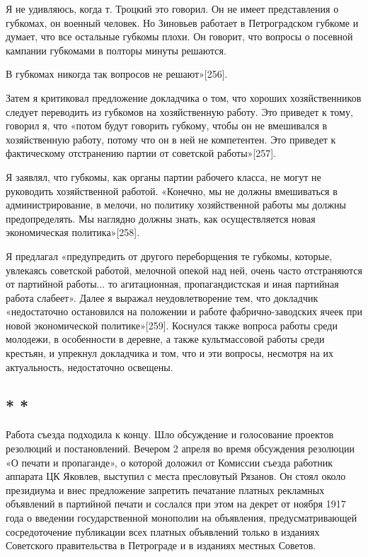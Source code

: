 \documentclass[12pt, a4paper, openany]{book}
\begin{document}
Я не удивляюсь, когда т. Троцкий это говорил. Он не имеет представления о губкомах, он военный человек. Но Зиновьев работает в Петроградском губкоме и думает, что все остальные губкомы плохи. Он говорит, что вопросы о посевной кампании губкомами в полторы минуты решаются.

В губкомах никогда так вопросов не решают»[256].

Затем я критиковал предложение докладчика о том, что хороших хозяйственников следует переводить из губкомов на хозяйственную работу. Это приведет к тому, говорил я, что «потом будут говорить губкому, чтобы он не вмешивался в хозяйственную работу, потому что он в ней не компетентен. Это приведет к фактическому отстранению партии от советской работы»[257].

Я заявлял, что губкомы, как органы партии рабочего класса, не могут не руководить хозяйственной работой. «Конечно, мы не должны вмешиваться в администрирование, в мелочи, но политику хозяйственной работы мы должны предопределять. Мы наглядно должны знать, как осуществляется новая экономическая политика»[258].

Я предлагал «предупредить от другого переборщения те губкомы, которые, увлекаясь советской работой, мелочной опекой над ней, очень часто отстраняются от партийной работы... то агитационная, пропагандистская и иная партийная работа слабеет». Далее я выражал неудовлетворение тем, что докладчик «недостаточно остановился на положении и работе фабрично-заводских ячеек при новой экономической политике»[259]. Коснулся также вопроса работы среди молодежи, в особенности в деревне, а также культмассовой работы среди крестьян, и упрекнул докладчика и том, что и эти вопросы, несмотря на их актуальность, недостаточно освещены.

\subsection*{\center * * *}

Работа съезда подходила к концу. Шло обсуждение и голосование проектов резолюций и постановлений. Вечером 2 апреля во время обсуждения резолюции «О печати и пропаганде», о которой доложил от Комиссии съезда работник аппарата ЦК Яковлев, выступил с места пресловутый Рязанов. Он стоял около президиума и внес предложение запретить печатание платных рекламных объявлений в партийной печати и сослался при этом на декрет от ноября 1917 года о введении государственной монополии на объявления, предусматривающей сосредоточение публикации всех платных объявлений только в изданиях Советского правительства в Петрограде и в изданиях местных Советов.
\end{document}
